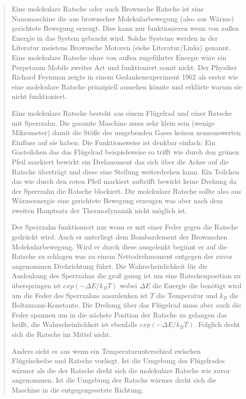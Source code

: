 \begin{quote}

Eine molekulare Ratsche oder auch Brownsche Ratsche ist eine Nanomaschine die aus brownscher Molekularbewegung (also aus Wärme) gerichtete Bewegung erzeugt.
Dies kann nur funktionieren wenn von außen Energie in das System gebracht wird.
Solche Systeme werden in der Literatur meistens Brownsche Motoren (siehe Literatur/Links) genannt.
Eine molekulare Ratsche ohne von außen zugeführter Energie wäre ein Perpetuum Mobile zweiter Art und funktioniert somit nicht.
Der Physiker Richard Feynman zeigte in einem Gedankenexperiment 1962 als erster wie eine molekulare Ratsche prinzipiell aussehen könnte und erklärte warum sie nicht funktioniert.

Eine molekulare Ratsche besteht aus einem Flügelrad und einer Ratsche mit Sperrzahn.
Die gesamte Maschine muss sehr klein sein (wenige Mikrometer) damit die Stöße des umgebenden Gases keinen nennenswerten Einfluss auf sie haben.
Die Funktionsweise ist denkbar einfach:
Ein Gasteilchen das das Flügelrad beispielsweise so trifft wie durch den grünen Pfeil markiert bewirkt ein Drehmoment das sich über die Achse auf die Ratsche überträgt und diese eine Stellung weiterdrehen kann.
Ein Teilchen das wie durch den roten Pfeil markiert auftrifft bewirkt keine Drehung da der Sperrzahn die Ratsche blockiert.
Die molekulare Ratsche sollte also aus Wärmeenergie eine gerichtete Bewegung erzeugen was aber nach dem zweiten Hauptsatz der Thermodynamik nicht möglich ist.

Der Sperrzahn funktioniert nur wenn er mit einer Feder gegen die Ratsche gedrückt wird.
Auch er unterliegt dem Bombardement der Brownschen Molekularbewegung.
Wird er durch diese ausgelenkt beginnt er auf die Ratsche zu schlagen was zu einem Nettodrehmoment entgegen der zuvor angenommen Drehrichtung führt.
Die Wahrscheinlichkeit für die Auslenkung des Sperrzahns die groß genug ist um eine Ratschenposition zu überspringen ist $exp(-\Delta E/k_BT)$ wobei $\Delta E$ die Energie die benötigt wird um die Feder des Sperrzahns auszulenken ist $T$ die Temperatur und $k_B$ die Boltzmann-Konstante.
Die Drehung über das Flügelrad muss aber auch die Feder spannen um in die nächste Position der Ratsche zu gelangen das heißt, die Wahrscheinlichkeit ist ebenfalls $exp(-\Delta E/k_BT)$.
Folglich dreht sich die Ratsche im Mittel nicht.

Anders sieht es aus wenn ein Temperaturunterschied zwischen Flügelscheibe und Ratsche vorliegt.
Ist die Umgebung des Flügelrades wärmer als die der Ratsche dreht sich die molekulare Ratsche wie zuvor angenommen.
Ist die Umgebung der Ratsche wärmer dreht sich die Maschine in die entgegengesetzte Richtung.

\end{quote}

